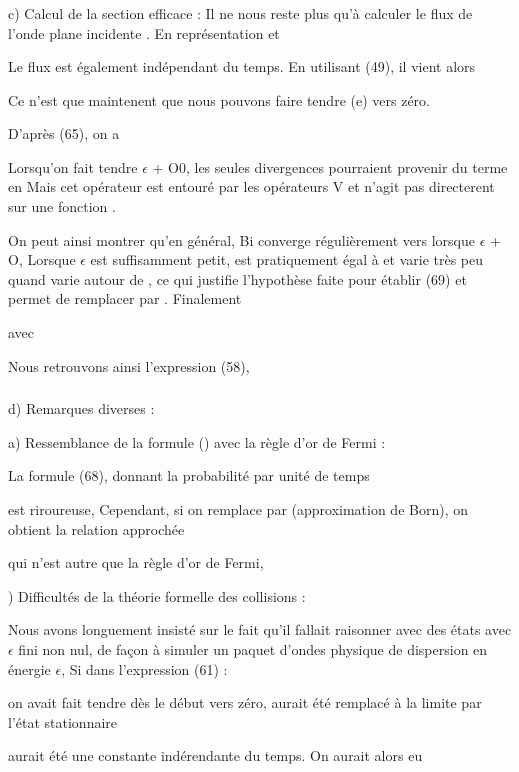 \subsubsection{}%
c) Calcul de la section efficace :
Il ne nous reste plus qu'à calculer le flux de l'onde plane
incidente . En représentation  et 

Le flux est également indépendant du temps. En utilisant (49), il vient
alors

Ce n'est que maintenent que nous pouvons faire tendre (e) vers zéro.

D'après (65), on a


Lorsqu'on fait tendre $\epsilon$ + O0, les seules divergences pourraient provenir
du terme en  Mais cet opérateur est entouré par les opérateurs V et n'agit pas
directerent sur une fonction .

On peut ainsi montrer qu'en général, Bi converge régulièrement vers
 lorsque $\epsilon$ + O, Lorsque $\epsilon$ est suffisamment petit,
 est pratiquement égal à  et varie très peu quand  varie autour
de , ce qui justifie l'hypothèse faite pour établir (69) et permet de
remplacer  par .
Finalement

avec 

Nous retrouvons ainsi l'expression (58),

\subsubsection{}%
d) Remarques diverses :

a) Ressemblance de la formule () avec la règle d'or de Fermi :

La formule (68), donnant la probabilité par unité de temps 

est riroureuse, Cependant, si on remplace  par 
(approximation de Born), on obtient la relation approchée

qui n'est autre que la règle d'or de Fermi,

) Difficultés de la théorie formelle des collisions :

Nous avons longuement insisté sur le fait qu'il fallait raisonner
avec des états  avec $\epsilon$ fini non nul, de façon à simuler un paquet
d'ondes physique de dispersion en énergie $\epsilon$, Si dans l'expression (61) :

on avait fait tendre dès le début  vers zéro, aurait été remplacé à la limite par
l'état stationnaire 

aurait été une constante indérendante du temps. On aurait alors eu 

